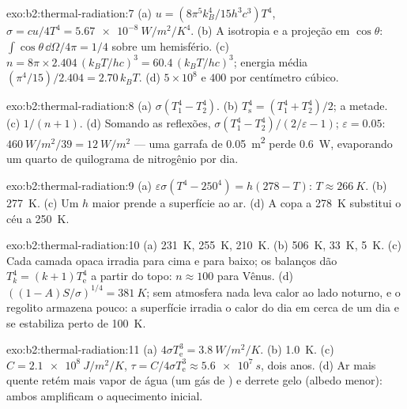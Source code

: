 \begin{solution}{exo:b2:thermal-radiation:7}
(a) $u = (8\pi^5k_B^4/15h^3c^3)T^4$, $\sigma = cu/4T^4 = \qty{5.67e-8}{W/m^2/K^4}$.
(b) A isotropia e a projeção em $\cos\theta$: $\int\cos\theta\,\dd\Omega/4\pi = 1/4$
sobre um hemisfério. (c) $n = 8\pi \times 2.404\,(k_BT/hc)^3 = 60.4\,(k_BT/hc)^3$;
energia média $(\pi^4/15)/2.404 = 2.70\,k_BT$. (d) $5 \times 10^8$ e $400$
por centímetro cúbico.
\end{solution}

\begin{solution}{exo:b2:thermal-radiation:8}
(a) $\sigma(T_1^4 - T_2^4)$. (b) $T_{\text{s}}^4 = (T_1^4 + T_2^4)/2$; a metade. (c)
$1/(n + 1)$. (d) Somando as reflexões, $\sigma(T_1^4 - T_2^4)/(2/\varepsilon -
1)$; $\varepsilon = 0.05$: $\qty{460}{W/m^2}/39 = \qty{12}{W/m^2}$ --- uma garrafa de
\qty{0.05}{m^2} perde \qty{0.6}{W}, evaporando um quarto de quilograma de
nitrogênio por dia.
\end{solution}

\begin{solution}{exo:b2:thermal-radiation:9}
(a) $\varepsilon\sigma(T^4 - 250^4) = h(278 - T)$: $T \approx \qty{266}{K}$. (b)
\qty{277}{K}. (c) Um $h$ maior prende a superfície ao ar. (d) A copa
a \qty{278}{K} substitui o céu a \qty{250}{K}.
\end{solution}

\begin{solution}{exo:b2:thermal-radiation:10}
(a) \qty{231}{K}, \qty{255}{K}, \qty{210}{K}. (b) \qty{506}{K}, \qty{33}{K}, \qty{5}{K}.
(c) Cada camada opaca irradia para cima e para baixo; os balanços dão
$T_k^4 = (k + 1)T_{\text{e}}^4$ a partir do topo: $n \approx 100$ para Vênus. (d)
$((1 - A)S/\sigma)^{1/4} = \qty{381}{K}$; sem atmosfera nada leva
calor ao lado noturno, e o regolito armazena pouco: a superfície
irradia o calor do dia em cerca de um dia e se estabiliza perto de
\qty{100}{K}.
\end{solution}

\begin{solution}{exo:b2:thermal-radiation:11}
(a) $4\sigma T_{\text{e}}^3 = \qty{3.8}{W/m^2/K}$. (b) \qty{1.0}{K}. (c) $C =
\qty{2.1e8}{J/m^2/K}$, $\tau = C/4\sigma T_{\text{e}}^3 \approx \qty{5.6e7}{s}$, dois
anos. (d) Ar mais quente retém mais vapor de água (um gás de ) e
derrete gelo (albedo menor): ambos amplificam o aquecimento inicial.
\end{solution}

